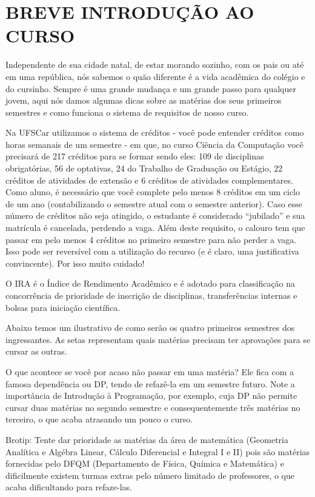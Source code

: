 \section{BREVE INTRODUÇÃO AO CURSO}
Independente de sua cidade natal, de estar morando sozinho, com os pais ou até em uma república, nós sabemos o quão diferente é a vida acadêmica do colégio e do cursinho. Sempre é uma grande mudança e um grande passo para qualquer jovem, aqui nós damos algumas dicas sobre as matérias dos seus primeiros semestres e como funciona o sistema de requisitos de nosso curso.

Na UFSCar utilizamos o sistema de créditos - você pode entender créditos como horas semanais de um semestre - em que, no curso Ciência da Computação você precisará de 217 créditos para se formar sendo eles: 109 de disciplinas obrigatórias, 56 de optativas, 24 do Trabalho de Graduação ou Estágio, 22 créditos de atividades de extensão e 6 créditos de atividades complementares. Como aluno, é necessário que você complete pelo menos 8 créditos em um ciclo de um ano (contabilizando o semestre atual com o semestre anterior). Caso esse número de créditos não seja atingido, o estudante é considerado ``jubilado'' e sua matrícula é cancelada, perdendo a vaga. Além deste requisito, o calouro tem que passar em pelo menos 4 créditos no primeiro semestre para não perder a vaga. Isso pode ser reversível com a utilização do recurso (e é claro, uma justificativa convincente). Por isso muito cuidado!

O IRA é o Índice de Rendimento Acadêmico e é adotado para classificação na concorrência de prioridade de inscrição de disciplinas, transferências internas e bolsas para iniciação científica.

Abaixo temos um ilustrativo de como serão os quatro primeiros semestres dos ingressantes. As setas representam quais matérias precisam ter aprovações para se cursar as outras.

O que acontece se você por acaso não passar em uma matéria? Ele fica com a
famosa dependência ou DP, tendo de refazê-la em um semestre futuro. Note a
importância de Introdução à Programação, por exemplo, cuja DP não permite
cursar duas matérias no segundo semestre e consequentemente três matérias no terceiro, o que acaba atrasando um pouco o curso.

Brotip: Tente dar prioridade as matérias da área de matemática (Geometria Analítica e Algébra Linear, Cálculo Diferencial e Integral I e II) pois são matérias fornecidas pelo DFQM (Departamento de Física, Química e Matemática)
e dificilmente existem turmas extras pelo número limitado de professores, o que acaba dificultando para refaze-las.

